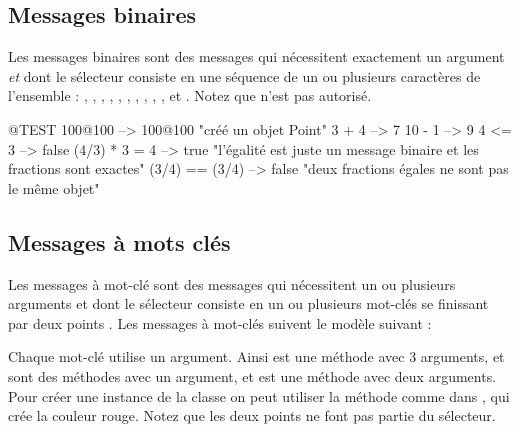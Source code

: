 \documentclass[a4paper,10pt,twoside]{book}
\begin{document}
\subsection{Messages binaires} 
Les messages binaires sont des messages qui n\'ecessitent exactement un argument \emph{et} dont le s\'electeur consiste en une s\'equence de un ou plusieurs caract\`eres de l'ensemble : \ct{+}, \ct{-}, \ct{*}, \ct{/}, \ct{&}, \ct{=}, \ct{>}, \ct{|}, \ct{<}, \ct{~}, et . Notez que \ct{--} n'est pas autoris\'e.

\begin{code}{@TEST}
100@100      --> 100@100  "cr\'{e}\'{e} un objet Point"
3 + 4              --> 7
10 - 1            --> 9
4 <= 3            --> false
(4/3) * 3 = 4   --> true  "l'\'egalit\'e est juste un message binaire et les fractions sont exactes"
(3/4) == (3/4) --> false  "deux fractions \'egales ne sont pas le m\^eme objet"
\end{code}


\subsection{Messages \`a mots cl\'es}

Les messages \`a mot-cl\'e sont des messages qui n\'ecessitent un ou plusieurs arguments et dont le s\'electeur consiste en un ou plusieurs mot-cl\'es se finissant par deux points \ct{\:}.  Les messages \`a mot-cl\'es suivent le mod\`ele suivant : 

Chaque mot-cl\'e utilise un argument. Ainsi  est une m\'ethode avec 3 arguments,  et  sont des m\'ethodes avec un argument, et  est une m\'ethode avec deux arguments. Pour cr\'eer une instance de la classe  on peut utiliser la m\'ethode  comme dans , qui cr\'ee la couleur rouge. Notez que les deux points ne font pas partie du s\'electeur.
\end{document}
